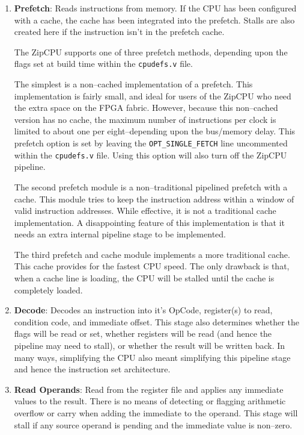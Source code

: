 \documentclass{gqtekspec}
\begin{document}
\begin{enumerate}
\item {\bf Prefetch}: Reads instructions from memory.  If the CPU has been 
	configured with a cache, the cache has been integrated into the
	prefetch.  Stalls are also created here if the instruction isn't
	in the prefetch cache.

	The ZipCPU supports one of three prefetch methods, depending upon the
	flags set at build time within the {\tt cpudefs.v} file. 

	The simplest
	is a non--cached implementation of a prefetch.  This implementation is
	fairly small, and ideal for users of the ZipCPU who need the extra
	space on the FPGA fabric.  However, because this non--cached version
	has no cache, the maximum number of instructions per clock is limited
	to about one per eight--depending upon the bus/memory delay.
	This prefetch option is set by leaving the {\tt OPT\_SINGLE\_FETCH}
	line uncommented within the {\tt cpudefs.v} file.  Using this option
	will also turn off the ZipCPU pipeline.

	The second prefetch module is a non--traditional pipelined prefetch
	with a cache.  This module tries to keep the instruction address
	within a window of valid instruction addresses.  While effective, it
	is not a traditional cache implementation.  A disappointing feature of
	this implementation is that it needs an extra internal pipeline stage
	to be implemented.

	The third prefetch and cache module implements a more traditional
	cache.  This cache provides for the fastest CPU speed.  The only
	drawback is that, when a cache line is loading, the CPU will be stalled
	until the cache is completely loaded.

\item {\bf Decode}: Decodes an instruction into it's OpCode, register(s) to
	read, condition code, and immediate offset.  This stage also
	determines whether the flags will be read or set, whether registers
	will be read (and hence the pipeline may need to stall), or whether the
	result will be written back.  In many ways, simplifying the CPU also
	meant simplifying this pipeline stage and hence the instruction set
	architecture.

\item {\bf Read Operands}: Read from the register file and applies any
	immediate values to the result.  There is no means of detecting or
	flagging arithmetic overflow or carry when adding the immediate to the
	operand.  This stage will stall if any source operand is pending
	and the immediate value is non--zero.


\end{enumerate}
\end{document}
